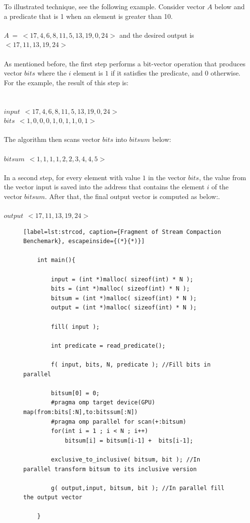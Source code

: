 \documentclass[Ingles]{ic-tese-v1}
\begin{document}
To illustrated  technique, see the following example.
Consider  vector $A$ below and a predicate that is 1 when an element is greater than 10.\\\\
$A \: = \: <17, 4, 6, 8, 11, 5, 13, 19, 0, 24>$ and the desired output is   $<17, 11, 13, 19, 24>$\\\\
As mentioned before, the first step performs a bit-vector operation that produces vector $bits$ where
the $i$ element is $1$ if it satisfies the predicate, and $0$ otherwise. For the example, the result of this step is:\\\\\\
$input \:\: <17, 4, 6, 8, 11, 5, 13, 19, 0, 24>$\\
$bits \:\: <1, 0, 0, 0, 1, 0, 1, 1, 0, 1>$\\\\
The algorithm then scans vector $bits$ into $bitsum$ below:\\\\
$bitsum \:\: <1, 1, 1, 1, 2, 2, 3, 4, 4, 5> $\\\\
In a second step, for every element with value $1$ in the vector $bits$, the value from the vector input is saved into the address that contains the element $i$ of the vector $bitsum$. After that, the final output vector is computed as below:.\\\\
$output \:\: <17, 11, 13, 19, 24>$\\
\begin{figure}[t]
	\lstset{basicstyle=\scriptsize}
	\begin{lstlisting}[label=lst:strcod, caption={Fragment of Stream Compaction Benchemark}, escapeinside={(*}{*)}]

	int main(){
		
		input = (int *)malloc( sizeof(int) * N );
		bits = (int *)malloc( sizeof(int) * N );
		bitsum = (int *)malloc( sizeof(int) * N );
		output = (int *)malloc( sizeof(int) * N );
		
		fill( input );
		
		int predicate = read_predicate();
		
		f( input, bits, N, predicate ); //Fill bits in parallel
		
		bitsum[0] = 0;
		#pragma omp target device(GPU) map(from:bits[:N],to:bitssum[:N])
		#pragma omp parallel for scan(+:bitsum)
		for(int i = 1 ; i < N ; i++)
			bitsum[i] = bitsum[i-1] +  bits[i-1];
		
		exclusive_to_inclusive( bitsum, bit ); //In parallel transform bitsum to its inclusive version 
		
		g( output,input, bitsum, bit ); //In parallel fill the output vector
		
	}
	\end{lstlisting}
\end{figure}
\end{document}
